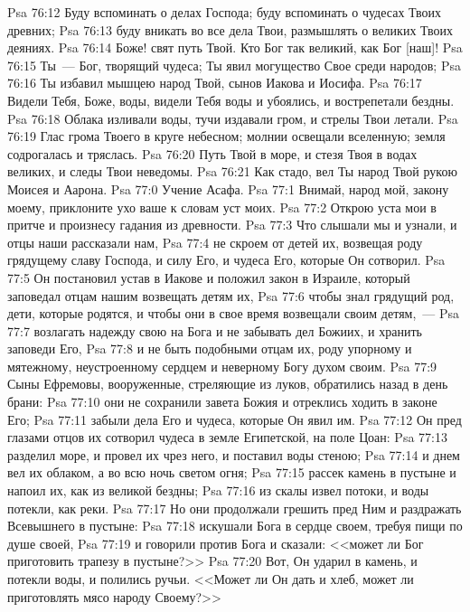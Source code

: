 \vs Psa 76:12 Буду вспоминать о делах Господа; буду вспоминать о чудесах Твоих древних;
\vs Psa 76:13 буду вникать во все дела Твои, размышлять о великих Твоих деяниях.
\vs Psa 76:14 Боже! свят путь Твой. Кто Бог так великий, как Бог [наш]!
\vs Psa 76:15 Ты~--- Бог, творящий чудеса; Ты явил могущество Свое среди народов;
\vs Psa 76:16 Ты избавил мышцею народ Твой, сынов Иакова и Иосифа.
\vs Psa 76:17 Видели Тебя, Боже, воды, видели Тебя воды и убоялись, и вострепетали бездны.
\vs Psa 76:18 Облака изливали воды, тучи издавали гром, и стрелы Твои летали.
\vs Psa 76:19 Глас грома Твоего в круге небесном; молнии освещали вселенную; земля содрогалась и тряслась.
\vs Psa 76:20 Путь Твой в море, и стезя Твоя в водах великих, и следы Твои неведомы.
\vs Psa 76:21 Как стадо, вел Ты народ Твой рукою Моисея и Аарона.
\vs Psa 77:0 Учение Асафа.
\rsbpar\vs Psa 77:1 Внимай, народ мой, закону моему, приклоните ухо ваше к словам уст моих.
\vs Psa 77:2 Открою уста мои в притче и произнесу гадания из древности.
\vs Psa 77:3 Что слышали мы и узнали, и отцы наши рассказали нам,
\vs Psa 77:4 не скроем от детей их, возвещая роду грядущему славу Господа, и силу Его, и чудеса Его, которые Он сотворил.
\vs Psa 77:5 Он постановил устав в Иакове и положил закон в Израиле, который заповедал отцам нашим возвещать детям их,
\vs Psa 77:6 чтобы знал грядущий род, дети, которые родятся, и чтобы они в свое время возвещали своим детям,~---
\vs Psa 77:7 возлагать надежду свою на Бога и не забывать дел Божиих, и хранить заповеди Его,
\vs Psa 77:8 и не быть подобными отцам их, роду упорному и мятежному, неустроенному сердцем и неверному Богу духом своим.
\vs Psa 77:9 Сыны Ефремовы, вооруженные, стреляющие из луков, обратились назад в день брани:
\vs Psa 77:10 они не сохранили завета Божия и отреклись ходить в законе Его;
\vs Psa 77:11 забыли дела Его и чудеса, которые Он явил им.
\vs Psa 77:12 Он пред глазами отцов их сотворил чудеса в земле Египетской, на поле Цоан:
\vs Psa 77:13 разделил море, и провел их чрез него, и поставил воды стеною;
\vs Psa 77:14 и днем вел их облаком, а во всю ночь светом огня;
\vs Psa 77:15 рассек камень в пустыне и напоил их, как из великой бездны;
\vs Psa 77:16 из скалы извел потоки, и воды потекли, как реки.
\vs Psa 77:17 Но они продолжали грешить пред Ним и раздражать Всевышнего в пустыне:
\vs Psa 77:18 искушали Бога в сердце своем, требуя пищи по душе своей,
\vs Psa 77:19 и говорили против Бога и сказали: <<может ли Бог приготовить трапезу в пустыне?>>
\vs Psa 77:20 Вот, Он ударил в камень, и потекли воды, и полились ручьи. <<Может ли Он дать и хлеб, может ли приготовлять мясо народу Своему?>>
